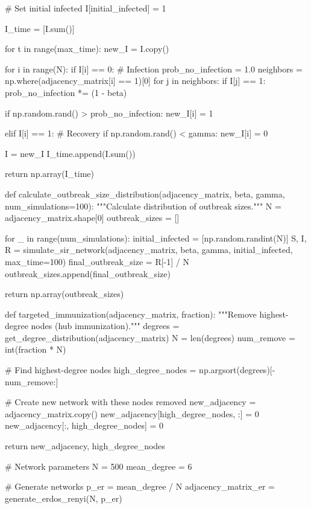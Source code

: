 \documentclass[a4paper, 11pt]{article}
\begin{document}
\begin{pycode}
    # Set initial infected
    I[initial_infected] = 1

    I_time = [I.sum()]

    for t in range(max_time):
        new_I = I.copy()

        for i in range(N):
            if I[i] == 0:
                # Infection
                prob_no_infection = 1.0
                neighbors = np.where(adjacency_matrix[i] == 1)[0]
                for j in neighbors:
                    if I[j] == 1:
                        prob_no_infection *= (1 - beta)

                if np.random.rand() > prob_no_infection:
                    new_I[i] = 1

            elif I[i] == 1:
                # Recovery
                if np.random.rand() < gamma:
                    new_I[i] = 0

        I = new_I
        I_time.append(I.sum())

    return np.array(I_time)

def calculate_outbreak_size_distribution(adjacency_matrix, beta, gamma, num_simulations=100):
    """Calculate distribution of outbreak sizes."""
    N = adjacency_matrix.shape[0]
    outbreak_sizes = []

    for _ in range(num_simulations):
        initial_infected = [np.random.randint(N)]
        S, I, R = simulate_sir_network(adjacency_matrix, beta, gamma, initial_infected, max_time=100)
        final_outbreak_size = R[-1] / N
        outbreak_sizes.append(final_outbreak_size)

    return np.array(outbreak_sizes)

def targeted_immunization(adjacency_matrix, fraction):
    """Remove highest-degree nodes (hub immunization)."""
    degrees = get_degree_distribution(adjacency_matrix)
    N = len(degrees)
    num_remove = int(fraction * N)

    # Find highest-degree nodes
    high_degree_nodes = np.argsort(degrees)[-num_remove:]

    # Create new network with these nodes removed
    new_adjacency = adjacency_matrix.copy()
    new_adjacency[high_degree_nodes, :] = 0
    new_adjacency[:, high_degree_nodes] = 0

    return new_adjacency, high_degree_nodes

# Network parameters
N = 500
mean_degree = 6

# Generate networks
p_er = mean_degree / N
adjacency_matrix_er = generate_erdos_renyi(N, p_er)


\end{pycode}
\end{document}
